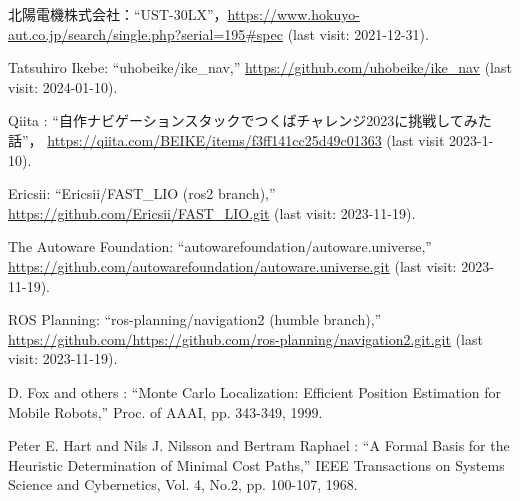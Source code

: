 \documentclass[twocolumn,9pt]{jsproceedings}
\begin{document}
\begin{thebibliography}{99}
  北陽電機株式会社：``UST-30LX''，\url{https://www.hokuyo-aut.co.jp/search/single.php?serial=195#spec} (last visit: 2021-12-31).




  Tatsuhiro Ikebe: ``uhobeike/ike\_nav,'' \url{https://github.com/uhobeike/ike_nav} (last visit: 2024-01-10).

  Qiita : ``自作ナビゲーションスタックでつくばチャレンジ2023に挑戦してみた話''，
  \url{https://qiita.com/BEIKE/items/f3ff141cc25d49c01363} (last visit 2023-1-10).

  Ericsii: ``Ericsii/FAST\_LIO (ros2 branch),'' \url{https://github.com/Ericsii/FAST_LIO.git} (last visit: 2023-11-19).

  The Autoware Foundation: ``autowarefoundation/autoware.universe,'' \url{https://github.com/autowarefoundation/autoware.universe.git} (last visit: 2023-11-19).

  ROS Planning: ``ros-planning/navigation2 (humble branch),'' \url{https://github.com/https://github.com/ros-planning/navigation2.git.git} (last visit: 2023-11-19).

  D. Fox and others : ``Monte Carlo Localization: Efficient Position Estimation for Mobile Robots,''
  Proc. of AAAI, pp. 343-349, 1999.

  Peter E. Hart and Nils J. Nilsson and Bertram Raphael : ``A Formal Basis for the Heuristic Determination of Minimal Cost Paths,''
  IEEE Transactions on Systems Science and Cybernetics, Vol. 4, No.2, pp. 100-107, 1968.



\end{thebibliography}
\end{document}
